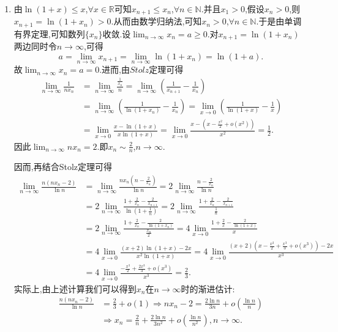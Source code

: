 \documentclass[lang=cn,newtx,10pt,scheme=chinese]{elegantbook}
\begin{document}
   \begin{solution}
   \begin{enumerate}
      \item 由\(\ln(1 + x) \leq x\),\(\forall x\in\mathbb{R}\)可知\(x_{n + 1} \leq x_n\),\(\forall n\in\mathbb{N}\).并且\(x_1 > 0\),假设\(x_n > 0\),则\(x_{n + 1} = \ln(1 + x_n) > 0\).从而由数学归纳法,可知\(x_n > 0\),\(\forall n\in\mathbb{N}\).于是由单调有界定理,可知数列\(\{x_n\}\)收敛.设\(\lim_{n\rightarrow\infty}x_n = a\geq0\).对\(x_{n + 1} = \ln(1 + x_n)\)两边同时令\(n\rightarrow\infty\),可得
      \[
      a = \lim_{n\rightarrow\infty}x_{n + 1} = \lim_{n\rightarrow\infty}\ln(1 + x_n) = \ln(1 + a).
      \]
      故\(\lim_{n\rightarrow\infty}x_n = a = 0\).进而,由\(Stolz\)定理可得
      \begin{align*}
      \lim_{n\rightarrow\infty}\frac{1}{nx_n}&=\lim_{n\rightarrow\infty}\frac{\frac{1}{x_n}}{n}=\lim_{n\rightarrow\infty}\left(\frac{1}{x_{n + 1}} - \frac{1}{x_n}\right)\\
      &=\lim_{n\rightarrow\infty}\left(\frac{1}{\ln(1 + x_n)} - \frac{1}{x_n}\right)=\lim_{x\rightarrow0}\left(\frac{1}{\ln(1 + x)} - \frac{1}{x}\right)\\
      &=\lim_{x\rightarrow0}\frac{x - \ln(1 + x)}{x\ln(1 + x)}=\lim_{x\rightarrow0}\frac{x - \left(x - \frac{x^2}{2} + o(x^2)\right)}{x^2}=\frac{1}{2}.
      \end{align*}
      因此\(\lim_{n\rightarrow\infty}nx_n = 2\).即\(x_n\sim\frac{2}{n}\),\(n\rightarrow\infty\).
      
      因而,再结合Stolz定理可得
      \begin{align*}
      \lim_{n\rightarrow\infty}\frac{n(nx_n - 2)}{\ln n}&=\lim_{n\rightarrow\infty}\frac{nx_n\left(n - \frac{2}{x_n}\right)}{\ln n}=2\lim_{n\rightarrow\infty}\frac{n - \frac{2}{x_n}}{\ln n}\\
      &=2\lim_{n\rightarrow\infty}\frac{1 + \frac{2}{x_n} - \frac{2}{x_{n + 1}}}{\ln\left(1 + \frac{1}{n}\right)}=2\lim_{n\rightarrow\infty}\frac{1 + \frac{2}{x_n} - \frac{2}{x_{n + 1}}}{\frac{1}{n}}\\
      &=2\lim_{n\rightarrow\infty}\frac{1 + \frac{2}{x_n} - \frac{2}{\ln(1 + x_n)}}{\frac{x_n}{2}}=4\lim_{x\rightarrow0}\frac{1 + \frac{2}{x} - \frac{2}{\ln(1 + x)}}{x}\\
      &=4\lim_{x\rightarrow0}\frac{(x + 2)\ln(1 + x) - 2x}{x^2\ln(1 + x)}=4\lim_{x\rightarrow0}\frac{(x + 2)\left(x - \frac{x^2}{2} + \frac{x^3}{3} + o(x^3)\right) - 2x}{x^3}\\
      &=4\lim_{x\rightarrow0}\frac{-\frac{x^3}{2} + \frac{2x^3}{3} + o(x^3)}{x^3}=\frac{2}{3}.
      \end{align*}
      实际上,由上述计算我们可以得到\(x_n\)在\(n\rightarrow\infty\)时的渐进估计:
      \begin{align*}
      \frac{n(nx_n - 2)}{\ln n}&=\frac{2}{3} + o(1)\Rightarrow nx_n - 2=\frac{2\ln n}{3n} + o\left(\frac{\ln n}{n}\right)\\
      &\Rightarrow x_n=\frac{2}{n} + \frac{2\ln n}{3n^2} + o\left(\frac{\ln n}{n^2}\right),n\rightarrow\infty.
      \end{align*}
   

\end{enumerate}
\end{solution}
\end{document}
